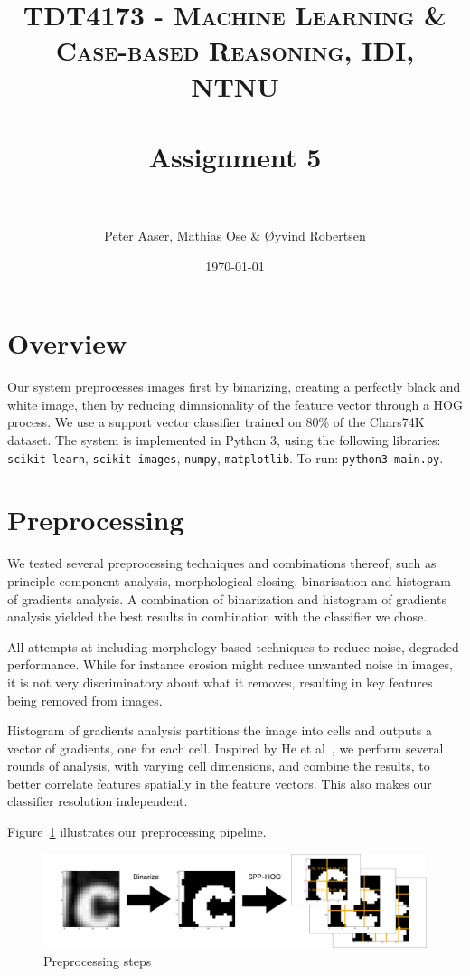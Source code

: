 \documentclass[paper=a4, fontsize=11pt]{scrartcl} %
\title{	
    \normalfont \normalsize 
    \textsc{TDT4173 - Machine Learning \& Case-based Reasoning, IDI, NTNU} \\ [25pt] %
    \horrule{0.5pt} \\[0.4cm] %
    \huge Assignment 5 \\ %
    \horrule{2pt} \\[0.5cm] %
}
\author{Peter Aaser, Mathias Ose \& Øyvind Robertsen} %
\date{\normalsize\today} %
\numberwithin{equation}{section} %
\numberwithin{figure}{section} %
\numberwithin{table}{section} %
\begin{document}
\maketitle %



\section{Overview}

Our system preprocesses images first by binarizing, creating a
perfectly black and white image, then by reducing dimnsionality of the
feature vector through a HOG process.  We use a support vector
classifier trained on 80\% of the Chars74K dataset.  The system is
implemented in Python 3, using the following libraries:
\texttt{scikit-learn}, \texttt{scikit-images}, \texttt{numpy},
\texttt{matplotlib}.  To run: \texttt{python3 main.py}.

\section{Preprocessing}

We tested several preprocessing techniques and combinations thereof,
such as principle component analysis, morphological closing,
binarisation and histogram of gradients analysis.  A combination of
binarization and histogram of gradients analysis yielded the best
results in combination with the classifier we chose.

All attempts at including morphology-based techniques to reduce noise, degraded performance.
While for instance erosion might reduce unwanted noise in images, it is not very discriminatory about what it removes, resulting in key features being removed from images.

Histogram of gradients analysis partitions the image into cells and
outputs a vector of gradients, one for each cell.  Inspired by He et
al~\cite{bib:spp}, we perform several rounds of analysis, with varying
cell dimensions, and combine the results, to better correlate features
spatially in the feature vectors. This also makes our classifier
resolution independent.

Figure~\ref{fig:preprocessing} illustrates our preprocessing pipeline.

\begin{figure}[H]
    \centering
    \includegraphics[width=0.8\linewidth]{img/preprocessing.pdf}
    \caption{Preprocessing steps} \label{fig:preprocessing}
\end{figure}
\end{document}
